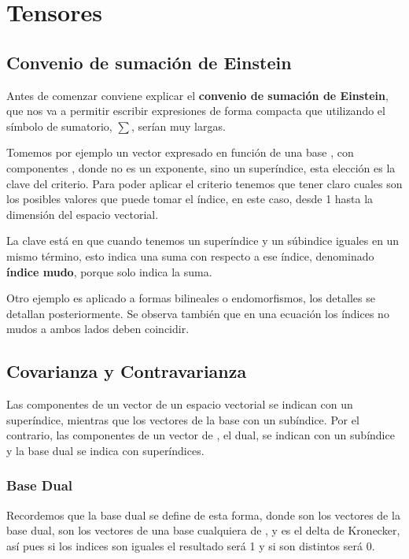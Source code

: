 \section{Tensores}
\subsection{Convenio de sumación de Einstein}
Antes de comenzar conviene explicar el \textbf{convenio de sumación de Einstein}, que nos va a permitir escribir expresiones de forma compacta que utilizando el símbolo de sumatorio, $\sum$, serían muy largas.

Tomemos por ejemplo un vector  expresado en función de una base , con componentes , donde  no es un exponente, sino un superíndice, esta elección es la clave del criterio.
\lrg{\[\bm{v}=\sum_{i=1}^n{v^i \bm{e}_i}=\sum{v^i \bm{e}_i}\equiv v^i \bm{e}_i\]}
Para poder aplicar el criterio tenemos que tener claro cuales son los posibles valores que puede tomar el índice, en este caso, desde 1 hasta la dimensión del espacio vectorial.

La clave está en que cuando tenemos un superíndice y un súbindice iguales en un mismo término, esto indica una suma con respecto a ese índice, denominado \textbf{índice mudo}, porque solo indica la suma.

Otro ejemplo es aplicado a formas bilineales o endomorfismos, los detalles se detallan posteriormente.
\lrg{\[\phi(\bm{v},\bm{w})=A_{ij} v^i w^j \;\;\;\;\; {f(\bm{v})}^j={M^j}_i \ v^i\]}
Se observa también que en una ecuación los índices no mudos a ambos lados deben coincidir.
\subsection{Covarianza y Contravarianza}
Las componentes de un vector de un espacio vectorial  se indican con un superíndice, mientras que los vectores de la base con un subíndice. Por el contrario, las componentes de un vector de , el dual, se indican con un subíndice y la base dual se indica con superíndices.
\subsubsection{Base Dual}
\vspace{-25pt}
Recordemos que la base dual se define de esta forma, donde  son los vectores de la base dual,  son los vectores de una base cualquiera de , y  es el delta de Kronecker, así pues si los indices son iguales el resultado será 1 y si son distintos será 0.
